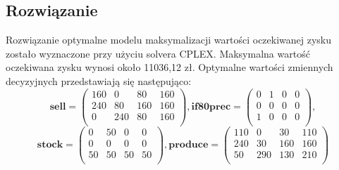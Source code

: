 \documentclass[11pt,a4paper]{article}
\begin{document}
\subsection{Rozwiązanie}
Rozwiązanie optymalne modelu maksymalizacji wartości oczekiwanej zysku zostało wyznaczone przy użyciu solvera CPLEX. 
Maksymalna wartość oczekiwana zysku wynosi około 11036,12 zł. 
Optymalne wartości zmiennych decyzyjnych przedstawiają się następująco:
\begin{displaymath}
\mathbf{sell} = 
 \begin{pmatrix}
  160 & 0 & 80 & 160 \\
  240 & 80 & 160 & 160 \\ 
  0 & 240 & 80 & 160 \\  
 \end{pmatrix},
 \mathbf{if80prec} = 
 \begin{pmatrix}
  0 & 1 & 0 & 0 \\
  0 & 0 & 0 & 0 \\ 
  1 & 0 & 0 & 0 \\  
 \end{pmatrix},
\end{displaymath}
\begin{displaymath}
\mathbf{stock} = 
 \begin{pmatrix}
  0 & 50 & 0 & 0 \\
  0 & 0 & 0 & 0 \\ 
  50 & 50 & 50 & 50 \\  
 \end{pmatrix},
 \mathbf{produce} = 
 \begin{pmatrix}
  110 & 0 & 30 & 110 \\
  240 & 30 & 160 & 160 \\ 
  50 & 290 & 130 & 210 \\  
 \end{pmatrix} 
\end{displaymath}
\end{document}
